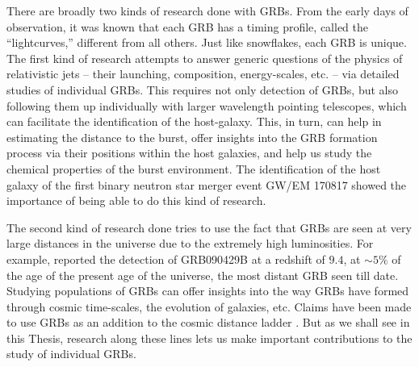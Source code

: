 There are broadly two kinds of research done with GRBs. From the early days of observation, it was known that each GRB has a timing profile, called the ``lightcurves,'' different from all others. Just like snowflakes, each GRB is unique. The first kind of research attempts to answer generic questions of the physics of relativistic jets -- their launching, composition, energy-scales, etc. -- via detailed studies of individual GRBs. This requires not only detection of GRBs, but also following them up individually with larger wavelength pointing telescopes, which can facilitate the identification of the host-galaxy. This, in turn, can help in estimating the distance to the burst, offer insights into the GRB formation process via their positions within the host galaxies, and help us study the chemical properties of the burst environment. The identification of the host galaxy of the first binary neutron star merger event GW/EM 170817 \citep{GW170817-2017, EM170817-2017} showed the importance of being able to do this kind of research.

The second kind of research done tries to use the fact that GRBs are seen at very large distances in the universe due to the extremely high luminosities. For example, \cite{Cucchiara_et_al.-2011-ApJ} reported the detection of GRB090429B at a redshift of $9.4$, at $\sim 5\%$ of the age of the present age of the universe, the most distant GRB seen till date. Studying populations of GRBs can offer insights into the way GRBs have formed through cosmic time-scales, the evolution of galaxies, etc. Claims have been made to use GRBs as an addition to the cosmic distance ladder . But as we shall see in this Thesis, research along these lines lets us make important contributions to the study of individual GRBs.



